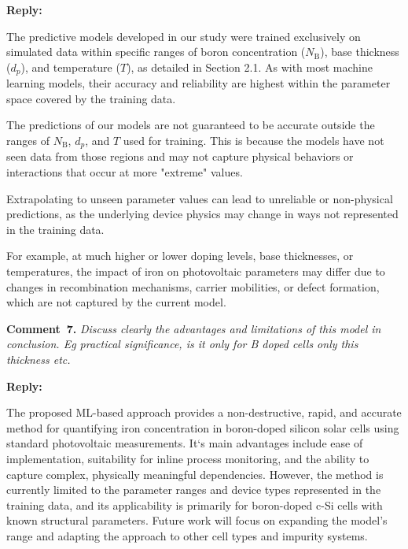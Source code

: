 \documentclass[a4paper,fleqn]{cas-sc}
\begin{document}
\noindent
\textcolor[rgb]{0.51,0.00,0.00}{\textbf{Reply:}}


The predictive models developed in our study were trained exclusively on simulated data within specific ranges of boron concentration ($N_\mathrm{B}$), base thickness ($d_p$), and temperature ($T$), as detailed in Section 2.1.
As with most machine learning models, their accuracy and reliability are highest within the parameter space covered by the training data.


The predictions of our models are not guaranteed to be accurate outside the ranges of $N_\mathrm{B}$, $d_p$, and $T$ used for training.
This is because the models have not seen data from those regions and may not capture physical behaviors or interactions that occur at more "extreme" values.


Extrapolating to unseen parameter values can lead to unreliable or non-physical predictions, as the underlying device physics may change in ways not represented in the training data.


For example, at much higher or lower doping levels, base thicknesses, or temperatures, the impact of iron on photovoltaic parameters may differ due to changes in recombination mechanisms, carrier mobilities, or defect formation, which are not captured by the current model.


\vspace{1cm}
\noindent
\textcolor[rgb]{0.00,0.50,1.00}{\textbf{Comment~7.}}
\emph{Discuss clearly the advantages and limitations of this model in conclusion. Eg practical significance, is it only for B doped cells only this thickness etc.}

\noindent
\textcolor[rgb]{0.51,0.00,0.00}{\textbf{Reply:}}

The proposed ML-based approach provides a non-destructive, rapid, and accurate method for quantifying iron concentration in boron-doped silicon solar cells using standard photovoltaic measurements.
It`s main advantages include ease of implementation, suitability for inline process monitoring, and the ability to capture complex, physically meaningful dependencies.
However, the method is currently limited to the parameter ranges and device types represented in the training data, and its applicability is primarily for boron-doped c-Si cells with known structural parameters.
Future work will focus on expanding the model’s range and adapting the approach to other cell types and impurity systems.



\end{document}
